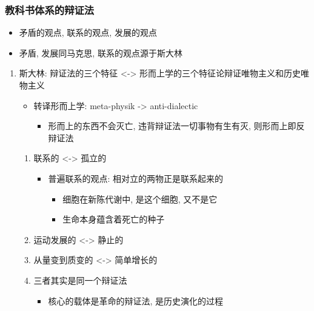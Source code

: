 \documentclass[11pt]{article}
\begin{document}
\subsubsection{教科书体系的辩证法}
\label{sec:orgdfe416a}
\begin{itemize}
\item 矛盾的观点, 联系的观点, 发展的观点
\item 矛盾, 发展同马克思, 联系的观点源于斯大林
\end{itemize}
\begin{enumerate}
\item 斯大林: 辩证法的三个特征 <-> 形而上学的三个特征\hfill{}\textsc{论辩证唯物主义和历史唯物主义}
\label{sec:org72272cb}
\begin{itemize}
\item 转译形而上学: meta-physik -> anti-dialectic
\begin{itemize}
\item 形而上的东西不会灭亡, 违背辩证法一切事物有生有灭, 则形而上即反辩证法
\end{itemize}
\end{itemize}
\begin{enumerate}
\item 联系的 <-> 孤立的
\label{sec:orga8a446f}
\begin{itemize}
\item 普遍联系的观点: 相对立的两物正是联系起来的
\begin{itemize}
\item 细胞在新陈代谢中, 是这个细胞, 又不是它
\item 生命本身蕴含着死亡的种子
\end{itemize}
\end{itemize}
\item 运动发展的 <-> 静止的
\label{sec:orgc23a9fc}
\item 从量变到质变的 <-> 简单增长的
\label{sec:org7a60134}
\item 三者其实是同一个辩证法
\label{sec:orgbbff875}
\begin{itemize}
\item 核心的载体是革命的辩证法, 是历史演化的过程
\end{itemize}
\end{enumerate}
\end{enumerate}
\end{document}
